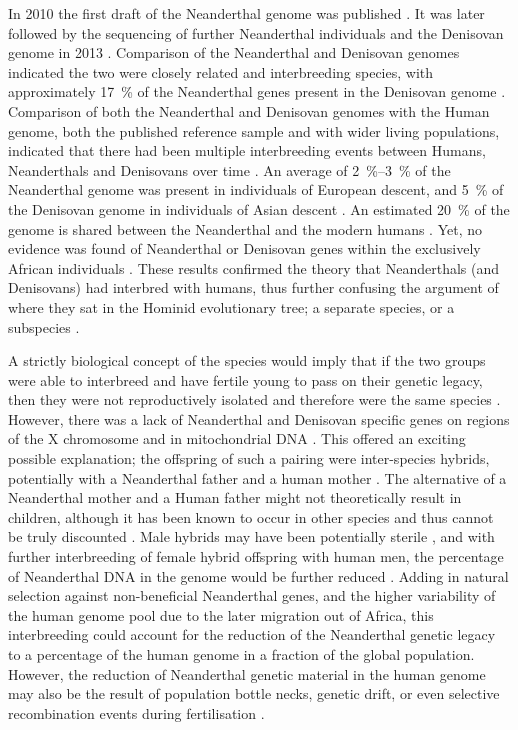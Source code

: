 In 2010 the first draft of the Neanderthal genome was published \parencite{Green_2010}. It was later followed by the sequencing of further Neanderthal individuals and the Denisovan genome in 2013 \parencites{Wang_2013}{Meyer_2012}{Martinón-Torres_2011}. Comparison of the Neanderthal and Denisovan genomes indicated the two were closely related and interbreeding species, with approximately \SI{17}{\percent} of the Neanderthal genes present in the Denisovan genome \parencite{Reich_2010}. Comparison of both the Neanderthal and Denisovan genomes with the Human genome, both the published reference sample and with wider living populations, indicated that there had been multiple interbreeding events between Humans, Neanderthals and Denisovans over time \parencites{Sankararaman_2014}{Sankararaman_2012}. An average of \SIrange[range-phrase=--]{2}{3}{\percent} of the Neanderthal genome was present in individuals of European descent, and \SI{5}{\percent} of the Denisovan genome in individuals of Asian descent \parencites{Sankararaman_2014}{Reich_2010}. 
An estimated \SI{20}{\percent} of the genome is shared between the Neanderthal and the modern humans \parencite{Yong_2014}. 
Yet, no evidence was found of Neanderthal or Denisovan genes within the exclusively African individuals \parencite{Sankararaman_2012}. These results confirmed the theory that Neanderthals (and Denisovans) had interbred with humans, thus further confusing the argument of where they sat in the Hominid evolutionary tree; a separate species, or a subspecies \parencite{Mason_2011}.

A strictly biological concept of the species would imply that if the two groups were able to interbreed and have fertile young to pass on their genetic legacy, then they were not reproductively isolated and therefore were the same species \parencite{White_2014}. 
However,  there was a lack of Neanderthal and Denisovan specific genes on regions of the X chromosome and in mitochondrial DNA \parencite{Serre_2004}. This offered an exciting possible explanation; the offspring of such a pairing were inter-species hybrids, potentially with a Neanderthal father and a human mother \parencites{Serre_2004}{Mason_2011}. The alternative of a Neanderthal mother and a Human father might not theoretically result in children, although it has been known to occur in other species and thus cannot be truly discounted \parencite{Patterson_2006}. Male hybrids may have been potentially sterile \parencite{Patterson_2006}, and with further interbreeding of female hybrid offspring with human men, the percentage of Neanderthal DNA in the genome would be further reduced \parencite{Mason_2011}. Adding in natural selection against non-beneficial Neanderthal genes, and the higher variability of the human genome pool due to the later migration out of Africa, this interbreeding could account for the reduction of the Neanderthal genetic legacy to a percentage of the human genome in a fraction of the global population. However, the reduction of Neanderthal genetic material in the human genome may also be the result of population bottle necks, genetic drift, or even selective recombination events during fertilisation \parencites{Harvati_2007}{Awadalla_1990}. 
	
